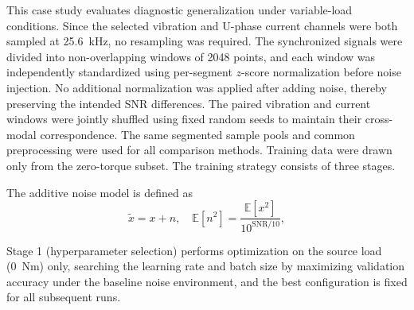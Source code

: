 \documentclass[a4paper]{cas-sc}
\begin{document}
This case study evaluates diagnostic generalization under
variable-load conditions. Since the selected vibration and U-phase current channels were both sampled at 25.6~kHz, no resampling was required. The synchronized signals were divided into non-overlapping windows of 2048 points, and each window was independently standardized using per-segment $z$-score normalization before noise injection. No additional normalization
was applied after adding noise, thereby preserving the intended SNR differences. The paired vibration and current windows were jointly shuffled using fixed random seeds to maintain their cross-modal correspondence. The same segmented sample pools and common preprocessing were used for all comparison methods. Training data were drawn only from the zero-torque subset. The training strategy consists of three stages.

The additive noise model is defined as
\begin{equation}
\tilde{x} = x + n,\quad
\mathbb{E}[n^2] = \frac{\mathbb{E}[x^2]}{10^{\mathrm{SNR}/10}},
\label{eq:snr_noise}
\end{equation}

Stage 1 (hyperparameter selection) performs optimization on the source load (0~Nm) only, searching the learning rate and batch size by maximizing validation accuracy under the baseline noise environment, and the best configuration is fixed for all subsequent runs.
\end{document}

